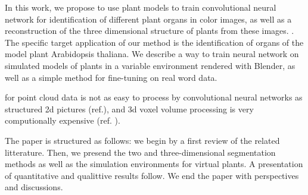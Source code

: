In this work, we propose to use plant models to train convolutional neural network for
identification of different plant organs in color images, as well as a
reconstruction of the three dimensional structure of plants from these images. .
The specific target application of our method is the identification of organs of the model
plant Arabidopsis thaliana. We describe a way to train neural network on simulated models of
plants in a variable environment rendered with Blender, as well as a simple method for
fine-tuning on real word data. 


 for point cloud data is not as
easy to process by convolutional neural networks as structured 2d pictures
(ref.), and 3d voxel volume processing is very computionally expensive (ref. ). 

The paper is structured as follows: we begin by a first review of the related
litterature. Then, we presend the two and three-dimensional segmentation methods
as well as the simulation environments for virtual plants. A presentation of
quantitative and qualittive results follow. We end the paper with perspectives
and discussions.
